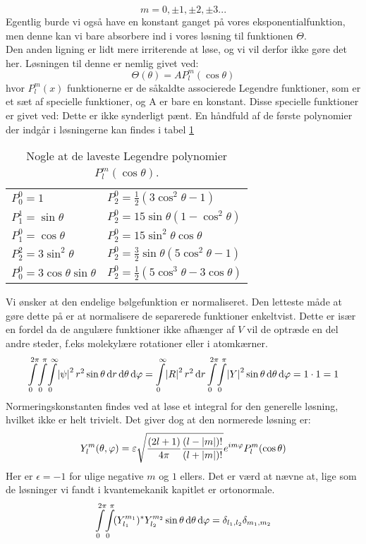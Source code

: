 \documentclass[../../Atom-ogMolekylefysik.tex]{subfiles}
\begin{document}
\begin{equation}
    m=0, \pm1, \pm2, \pm3... 
\end{equation}
Egentlig burde vi også have en konstant ganget på vores eksponentialfunktion, men denne kan vi bare absorbere ind i vores løsning til funktionen $\Theta$.\\
Den anden ligning er lidt mere irriterende at løse, og vi vil derfor ikke gøre det her. Løsningen til denne er nemlig givet ved:
\begin{equation}
    \Theta(\theta)=AP_{l}^{m}(\cos\theta)
\end{equation}
hvor $P_{l}^{m}(x)$ funktionerne er de såkaldte associerede Legendre funktioner, som er et sæt af specielle funktioner, og A er bare en konstant. Disse specielle funktioner er givet ved:
Dette er ikke synderligt pænt. En håndfuld af de første polynomier der indgår i løsningerne kan findes i tabel \ref{tab:AMO:legendre}
\begin{table}[h]
    \centering
    \begin{tabular}{ll}
        $P_0^0 = 1$ & $P_2^0 = \frac{1}{2}(3\cos^2 \theta-1)$ \\
        $P_1^1 = \sin\theta$ & $P_2^0 = 15\sin\theta (1-\cos^2\theta)$ \\
        $P_1^0 = \cos \theta$ & $P_2^0 = 15\sin^2\theta \cos\theta$ \\
        $P_2^2 = 3\sin^2 \theta$ & $P_2^0 = \frac{3}{2}\sin\theta(5\cos^2\theta-1)$ \\
        $P_0^0 = 3\cos \theta\sin\theta$ & $P_2^0 = \frac{1}{2}(5\cos^3\theta-3\cos\theta)$ \\
    \end{tabular}
    \caption{Nogle at de laveste Legendre polynomier $P_l^m(\cos \theta)$.}
    \label{tab:AMO:legendre}
\end{table}
Vi ønsker at den endelige bølgefunktion er normaliseret. Den letteste måde at gøre dette på er at normalisere de separerede funktioner enkeltvist. Dette er især en fordel da de angulære funktioner ikke afhænger af $V$ vil de optræde en del andre steder, f.eks molekylære rotationer eller i atomkærner.
$$
\integral{\integral{\integral{\abs{\psi}^2r^2\sin\theta}{r}{0}{\infty}}{\theta}{0}{\pi}}{\phi}{0}{2\pi}=\integral{\abs{R}^2r^2}{r}{0}{\infty}\integral{\integral{\abs{Y}^2\sin\theta}{\theta}{0}{\pi}}{\phi}{0}{2\pi}=1\cdot 1 = 1
$$
Normeringskonstanten findes ved at løse et integral for den generelle løsning, hvilket ikke er helt trivielt. Det giver dog at den normerede løsning er:
\begin{equation}
Y_l^m(\theta,\phi)=\epsilon\sqrt{\frac{(2l+1)}{4\pi}\frac{(l-\abs{m})!}{(l+\abs{m})!}}e^{im\phi}P_l^m(\cos\theta)
\end{equation}
Her er $\epsilon=-1$ for ulige negative $m$ og $1$ ellers.
Det er værd at nævne at, lige som de løsninger vi fandt i kvantemekanik kapitlet er ortonormale.
$$
\integral{\integral{(Y_{l_1}^{m_1})^*Y_{l_2}^{m_2}\sin\theta}{\theta}{0}{\pi}}{\phi}{0}{2\pi}=\delta_{l_1,l_2}\delta_{m_1,m_2}
$$
\end{document}
